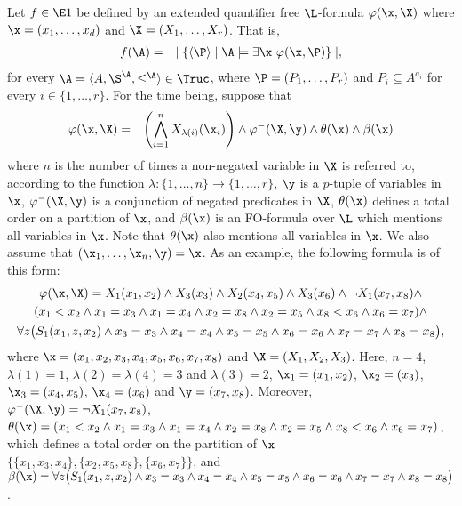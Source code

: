 Let $f \in \E1$ be defined by an extended quantifier free $\L$-formula $\varphi(\x,\X)$ where $\x = (x_1,\dots,x_d)$ and $\X = (X_1,\dots,X_r)$. That is,
\begin{eqnarray*}
f(\A) &=& \mid \{ \langle\P\rangle \mid \A \models \exists \x \ \varphi(\x,\P) \} \mid \label{f1},
\end{eqnarray*}
for every $\A = \langle A, \S^{\A}, \leq^{\A} \rangle \in \Truc$, where $\P = (P_1,\ldots,P_r)$ and $P_i \subseteq A^{a_i}$ for every $i \in \{1,\ldots,r\}$. 
For the time being, suppose that
\begin{eqnarray}
\varphi(\x,\X) &=& \left( \bigwedge_{i=1}^n X_{\lambda(i)}(\x_i) \right) \wedge \varphi^{-}(\X,\y) \wedge \theta(\x) \wedge \beta(\x)
\end{eqnarray}
where $n$ is the number of times a non-negated variable in $\X$ is referred to, according to the function $\lambda:\{1,\ldots,n\}\to\{1,\ldots,r\}$, $\y$ is a $p$-tuple of variables in $\x$, $\varphi^{-}(\X,\y)$ is a conjunction of negated predicates in $\X$, $\theta(\x)$ defines a total order on a partition of $\x$, and $\beta(\x)$ is an FO-formula over $\L$ which mentions all variables in $\x$.
Note that $\theta(\x)$ also mentions all variables in $\x$. We also assume that $(\x_1,\dots,\x_n,\y) = \x$. 
As an example, the following formula is of this form:
\begin{multline*}
\varphi(\x,\X) =  X_1(x_1,x_2) \wedge X_3(x_3) \wedge X_2(x_4,x_5) \wedge X_3(x_6) \wedge \neg X_1(x_7,x_8) \wedge \\ (x_1 < x_2 \wedge x_1 = x_3 \wedge x_1 = x_4 \wedge x_2 = x_8 \wedge x_2 = x_5 \wedge x_8 < x_6 \wedge x_6 = x_7 ) \wedge \\ \forall z\big( S_1(x_1,z,x_2) \wedge x_3 = x_3 \wedge x_4 = x_4 \wedge x_5 = x_5 \wedge x_6 = x_6 \wedge x_7 = x_7 \wedge x_8 = x_8 \big),
\end{multline*}
where $\x = (x_1,x_2,x_3,x_4,x_5,x_6,x_7,x_8)$ and $\X = (X_1,X_2,X_3)$. Here, $n = 4$, $\lambda(1) = 1$, $\lambda(2) = \lambda(4) = 3$ and $\lambda(3) = 2$, $\x_1 = (x_1,x_2)$, $\x_2 = (x_3)$, $\x_3 = (x_4,x_5)$, $\x_4 = (x_6)$ and $\y = (x_7,x_8)$. Moreover, $\varphi^{-}(\X,\y) = \neg X_1(x_7,x_8)$, $\theta(\x) = (x_1 < x_2 \wedge x_1 = x_3 \wedge x_1 = x_4 \wedge x_2 = x_8 \wedge x_2 = x_5 \wedge x_8 < x_6 \wedge x_6 = x_7 )$, which defines a total order on the partition of $\x$ $\{\{x_1,x_3,x_4\},\{x_2,x_5,x_8\},\{x_6,x_7\}\}$, and $\beta(\x) = \forall z\big( S_1(x_1,z,x_2) \wedge x_3 = x_3 \wedge x_4 = x_4 \wedge x_5 = x_5 \wedge x_6 = x_6 \wedge x_7 = x_7 \wedge x_8 = x_8 \big)$.

